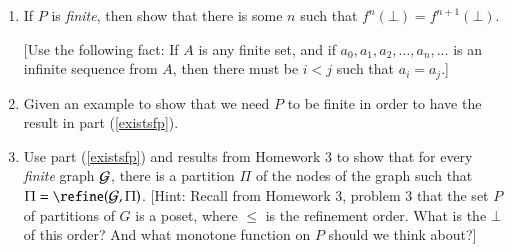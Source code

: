\documentclass[12pt]{article}
\begin{document}
\begin{enumerate}
\item If $P$ is \emph{finite}, then show that there is some $n$ such that $f^n(\bot) = f^{n+1}(\bot)$.

[Use the following fact:  If $A$ is any finite set, and if $a_0, a_1, a_2, \ldots, a_n, \ldots$ is an infinite
sequence from $A$, then there must be $i < j$ such that $a_i = a_j$.]
\label{existsfp}
\item Given an example to show that we need $P$ to be finite in order to have the result in   part (\ref{existsfp}).
\item Use part (\ref{existsfp}) and results from Homework 3 to show that for every \emph{finite} graph ${\cal G}$, there is a partition 
$\Pi$ of the nodes of the graph such that $\Pi = \refine(\GG,\Pi)$.  [Hint: 
  Recall from Homework 3, problem 3 that the set $P$ of partitions of $G$ is a poset, where $\leq$ is the refinement 
order.   What is the $\bot$ of this order?   And what monotone function on $P$ should we think about?]

\end{enumerate}
\label{existsfpartition}
\end{document}
